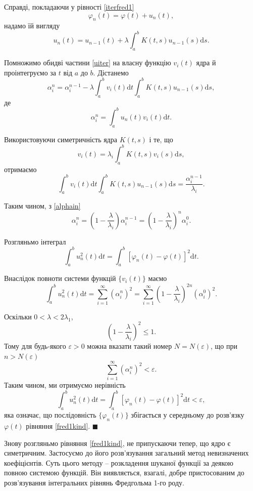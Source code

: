\documentclass[14pt,twoside]{extreport}
\theoremstyle{mystyle}
\renewenvironment{proof}{{\bfseries Доведення.}}{$\blacksquare$}
\numberwithin{equation}{chapter}
\begin{document}
\begin{proof}
Справді, покладаючи у рівності \eqref{iterfred1}
\[
 \varphi_n(t) = \varphi(t) + u_n(t),
\]
надамо їй вигляду
\begin{equation}\label{uiter}
 u_n(t) = u_{n-1}(t) + \lambda \int_{a}^{b} K(t, s) u_{n-1}(s) \mathrm{d}s.
\end{equation}

Помножимо обидві частини \eqref{uiter} на власну функцію $v_i(t)$ ядра й проінтегруємо за $t$ від $a$ до $b$. Дістанемо
\begin{equation}\label{alphain}
 \alpha_i^n = \alpha_i^{n-1} - \lambda \int_{a}^{b} v_i(t) \mathrm{d}t \int_{a}^{b} K(t, s) u_{n-1}(s) \mathrm{d}s,
\end{equation}
де
\[
 \alpha_i^n = \int_{a}^{b} u_n(t) v_i(t) \mathrm{d}t.
\]

Використовуючи симетричність ядра $K(t, s)$ і те, що
\[
 v_i(t) = \lambda_i \int_{a}^{b} K(t, s) v_i(s) \mathrm{d}s,
\]
отримаємо
\[
 \int_{a}^{b} v_i(t) \mathrm{d}t \int_{a}^{b} K(t, s) u_{n-1}(s) \mathrm{d}s = \frac{\alpha_i^{n-1}}{\lambda_i}.
\]

Таким чином, з \eqref{alphain}
\[
 \alpha_i^n = \left(1 - \frac{\lambda}{\lambda_i}\right) \alpha_i^{n-1} = \left(1 - \frac{\lambda}{\lambda_i}\right)^n \alpha_i^0.
\]

Розгляньмо інтеграл
\[
 \int_{a}^{b} u_n^2(t)\mathrm{d}t = \int_{a}^{b} [\varphi_n(t) - \varphi(t)]^2 \mathrm{d}t.
\]

Внаслідок повноти системи функцій $\{v_i(t)\}$ маємо
\[
 \int_{a}^{b} u_n^2(t) \mathrm{d}t = \sum_{i=1}^{\infty} (\alpha_i^n)^2 = \sum_{i=1}^{\infty} \left(1-\frac{\lambda}{\lambda_i}\right)^{2n} (\alpha_i^0)^2.
\]

Оскільки $0<\lambda < 2 \lambda_1$,
\[
 \left(1 - \frac{\lambda}{\lambda_i}\right)^2 \leqslant 1.
\]
Тому для будь-якого $\varepsilon > 0$ можна вказати такий номер $N = N(\varepsilon)$, що при $n > N(\varepsilon)$
\[
 \sum_{i=1}^{\infty} \left(\alpha_i^n\right)^2 < \varepsilon.
\]
Таким чином, ми отримуємо нерівність
\[
 \int_{a}^{b} u_n^2(t) \mathrm{d}t = \int_{a}^{b} \left[\varphi_n(t) - \varphi(t)\right]^2 \mathrm{d}t < \varepsilon,
\]
яка означає, що послідовність $\{\varphi_n(t)\}$ збігається у середньому до розв'язку $\varphi(t)$ рівняння \eqref{fred1kind}.
\end{proof}

Знову розгляньмо рівняння \eqref{fred1kind}, не припускаючи тепер, що ядро є симетричним. Застосуємо до його розв'язування загальний метод невизначених коефіцієнтів. Суть цього методу -- розкладення шуканої функції за деякою повною системою функцій. Він виявляється, взагалі, добре пристосованим до розв'язування інтегральних рівнянь Фредгольма 1-го роду.
\end{document}
